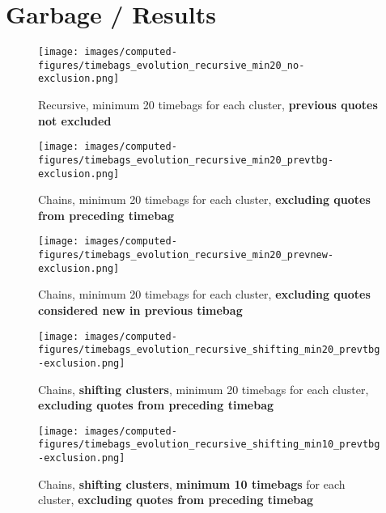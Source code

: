\section*{Garbage / Results}\label{sec:results}

\begin{figure*}[!th]
    \centering
    \texttt{[image: images/computed-figures/timebags\_evolution\_recursive\_min20\_no-exclusion.png]}
    \caption{Recursive, minimum 20 timebags for each cluster, \textbf{previous quotes not excluded}}
    \label{fig:timebags-evolution}
\end{figure*}

\begin{figure*}[!th]
    \centering
    \texttt{[image: images/computed-figures/timebags\_evolution\_recursive\_min20\_prevtbg-exclusion.png]}
    \caption{Chains, minimum 20 timebags for each cluster, \textbf{excluding quotes from preceding timebag}}
    \label{fig:timebags-evolution}
\end{figure*}

\begin{figure*}[!th]
    \centering
    \texttt{[image: images/computed-figures/timebags\_evolution\_recursive\_min20\_prevnew-exclusion.png]}
    \caption{Chains, minimum 20 timebags for each cluster, \textbf{excluding quotes considered new in previous timebag}}
    \label{fig:timebags-evolution}
\end{figure*}

\begin{figure*}[!th]
    \centering
    \texttt{[image: images/computed-figures/timebags\_evolution\_recursive\_shifting\_min20\_prevtbg-exclusion.png]}
    \caption{Chains, \textbf{shifting clusters}, minimum 20 timebags for each cluster, \textbf{excluding quotes from preceding timebag}}
    \label{fig:timebags-evolution}
\end{figure*}

\begin{figure*}[!th]
    \centering
    \texttt{[image: images/computed-figures/timebags\_evolution\_recursive\_shifting\_min10\_prevtbg-exclusion.png]}
    \caption{Chains, \textbf{shifting clusters}, \textbf{minimum 10 timebags} for each cluster, \textbf{excluding quotes from preceding timebag}}
    \label{fig:timebags-evolution}
\end{figure*}

